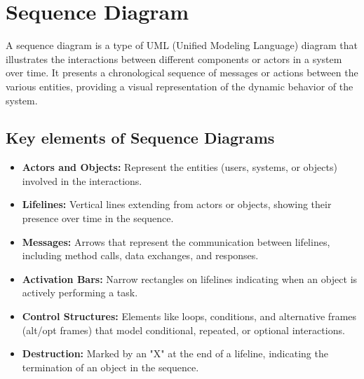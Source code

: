 \section{Sequence Diagram}

A sequence diagram is a type of UML (Unified Modeling Language) diagram that illustrates the interactions between different components or actors in a system over time. It presents a chronological sequence of messages or actions between the various entities, providing a visual representation of the dynamic behavior of the system.
\subsection{Key elements of Sequence Diagrams}

\begin{itemize}
    \item \textbf{Actors and Objects:} Represent the entities (users, systems, or objects) involved in the interactions.
    \item \textbf{Lifelines:} Vertical lines extending from actors or objects, showing their presence over time in the sequence.
    \item \textbf{Messages:} Arrows that represent the communication between lifelines, including method calls, data exchanges, and responses.
    \item \textbf{Activation Bars:} Narrow rectangles on lifelines indicating when an object is actively performing a task.
    \item \textbf{Control Structures:} Elements like loops, conditions, and alternative frames (alt/opt frames) that model conditional, repeated, or optional interactions.
    \item \textbf{Destruction:} Marked by an "X" at the end of a lifeline, indicating the termination of an object in the sequence.
\end{itemize}

